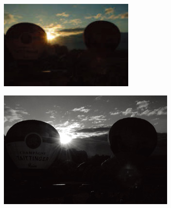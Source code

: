 \documentclass[letterpaper,10pt]{article}
\begin{document}
			\begin{figure}[htbp] 
				\centering 
				
				\begin{subfigure}{0.11\textwidth}
					\includegraphics[width=\linewidth]{picture/LLIE/Division Gets Better/RGB-low light1}
					\captionsetup{font=scriptsize}
					\label{fig: RGB-low light1}
				\end{subfigure}
				\begin{subfigure}{0.11\textwidth}
					\includegraphics[width=\linewidth]{picture/LLIE/Division Gets Better/R1}
					\captionsetup{font=scriptsize}
					\label{fig: R1}
				\end{subfigure}
				\begin{subfigure}{0.11\textwidth}

\end{subfigure}
\end{figure}
\end{document}
